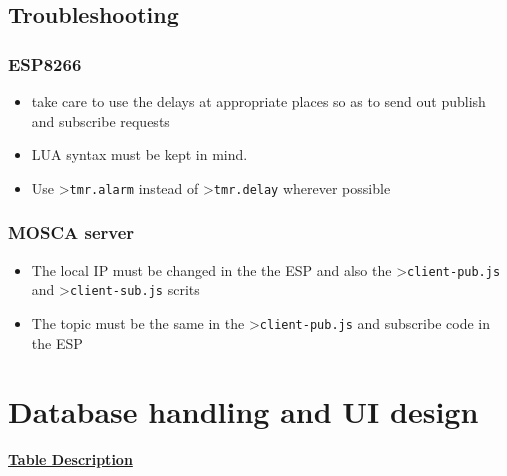 \documentclass[16pt]{article}
\begin{document}
\subsection{Troubleshooting}


\subsubsection{ESP8266}

\begin{itemize}

\item
  take care to use the delays at appropriate places so as to send out
  publish and subscribe requests
\item
  LUA syntax must be kept in mind.
\item
  Use \textgreater{}\texttt{tmr.alarm} instead of
  \textgreater{}\texttt{tmr.delay} wherever possible
\end{itemize}

\vspace{0.6cm}

\subsubsection{MOSCA server}

\begin{itemize}

\item
  The local IP must be changed in the the ESP and also the
  \textgreater{}\texttt{client-pub.js} and
  \textgreater{}\texttt{client-sub.js} scrits
\item
  The topic must be the same in the \textgreater{}\texttt{client-pub.js}
  and subscribe code in the ESP
\end{itemize}

\vspace{0.5cm}



\vspace{12cm}

\section{Database handling and UI design\\}

\vspace{0.3cm}
{\Large{\underline{\textbf{Table Description}}}}
\vspace{0.2cm}
\end{document}
